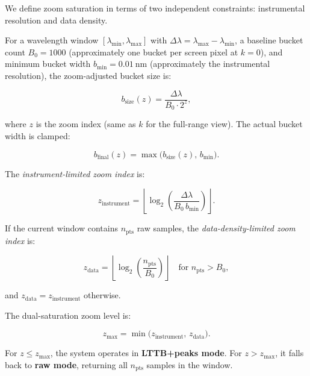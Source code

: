 \documentclass[a4paper,twocolumn,10pt]{article}
\begin{document}
We define zoom saturation in terms of two independent constraints:
instrumental resolution and data density.

For a wavelength window $[\lambda_{\min}, \lambda_{\max}]$ with
$\Delta\lambda = \lambda_{\max} - \lambda_{\min}$, a baseline bucket
count $B_0 = 1000$ (approximately one bucket per screen pixel at
$k=0$), and minimum bucket width $b_{\min} = \SI{0.01}{\nano\metre}$
(approximately the instrumental resolution), the zoom-adjusted bucket
size is:

\begin{equation}
\label{eq:bsize}
b_{\text{size}}(z) = \frac{\Delta\lambda}{B_0 \cdot 2^z},
\end{equation}

where $z$ is the zoom index (same as $k$ for the full-range view).
The actual bucket width is clamped:

\begin{equation}
\label{eq:bfinal}
b_{\text{final}}(z) = \max\!\bigl(b_{\text{size}}(z),\, b_{\min}\bigr).
\end{equation}

The \emph{instrument-limited zoom index} is:

\begin{equation}
\label{eq:zinstr}
z_{\text{instrument}} =
\left\lfloor
\log_2\!\left(
\frac{\Delta\lambda}{B_0 \, b_{\min}}
\right)
\right\rfloor.
\end{equation}

If the current window contains $n_{\text{pts}}$ raw samples, the
\emph{data-density-limited zoom index} is:

\begin{equation}
\label{eq:zdata}
z_{\text{data}} =
\left\lfloor
\log_2\!\left(
\frac{n_{\text{pts}}}{B_0}
\right)
\right\rfloor
\quad \text{for } n_{\text{pts}} > B_0,
\end{equation}

and $z_{\text{data}} = z_{\text{instrument}}$ otherwise.

The dual-saturation zoom level is:

\begin{equation}
\label{eq:zmax}
z_{\max} = \min\!\bigl(z_{\text{instrument}},\, z_{\text{data}}\bigr).
\end{equation}

For $z \leq z_{\max}$, the system operates in \textbf{LTTB+peaks mode}.
For $z > z_{\max}$, it falls back to \textbf{raw mode}, returning all
$n_{\text{pts}}$ samples in the window.
\end{document}

